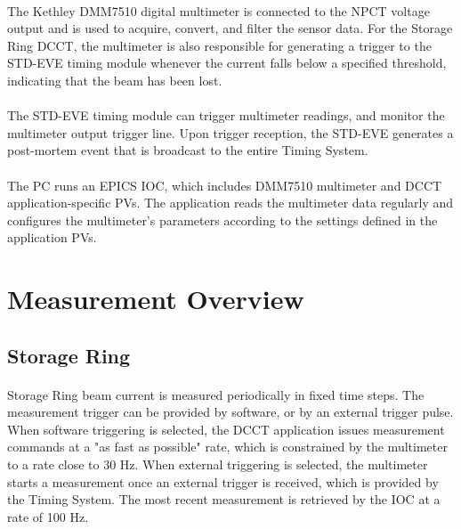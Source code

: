 \documentclass[openany]{article}
\begin{document}
	\paragraph{} The Kethley DMM7510 digital multimeter is connected to the NPCT voltage output and is used to acquire, convert, and filter the sensor data. For the Storage Ring DCCT, the multimeter is also responsible for generating a trigger to the STD-EVE timing module whenever the current falls below a specified threshold, indicating that the beam has been lost.

	\paragraph{} The STD-EVE timing module can trigger multimeter readings, and monitor the multimeter output trigger line. Upon trigger reception, the STD-EVE generates a post-mortem event that is broadcast to the entire Timing System.

	\paragraph{} The PC runs an EPICS IOC, which includes DMM7510 multimeter and DCCT application-specific PVs. The application reads the multimeter data regularly and configures the multimeter's parameters according to the settings defined in the application PVs.

\section{Measurement Overview}

	\subsection{Storage Ring} 

		\paragraph{} Storage Ring beam current is measured periodically in fixed time steps. The measurement trigger can be provided by software, or by an external trigger pulse. When software triggering is selected, the DCCT application issues measurement commands at a "as fast as possible" rate, which is constrained by the multimeter to a rate close to 30 Hz. When external triggering is selected, the multimeter starts a measurement once an external trigger is received, which is provided by the Timing System. The most recent measurement is retrieved by the IOC at a rate of 100 Hz.
\end{document}
